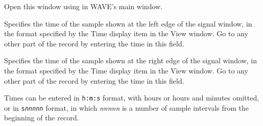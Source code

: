 \documentclass[twoside]{book}
\newcommand{\button}[1]{\cornersize{2}\ovalbox{\rule[-.3mm]{0cm}{2.5mm}\small\sf ~#1~}}
\newcommand{\WAVE}{{\sf WAVE}\xspace}
\begin{document}
\begin{figure}[h]
\centerline{}
\end{figure}
\label{sec:find-window}
Open this window using \button{Find...} in \WAVE{}'s main window.

\begin{description}

\item[{\sf Start time}]
Specifies the time of the sample shown at the left edge of the signal window,
in the format specified by the {\sf Time display} item in the {\sf View}
window.  Go to any other part of the record by entering the time in this field.

\item[{\sf End time}]
Specifies the time of the sample shown at the right edge of the signal window,
in the format specified by the {\sf Time display} item in the {\sf View}
window.  Go to any other part of the record by entering the time in this field.
\end{description}

Times can be entered in {\tt h:m:s} format, with hours or hours and minutes
omitted, or in {\tt s{\it nnnnn}} format, in which {\it nnnnn} is a number of
sample intervals from the beginning of the record.
\end{document}
